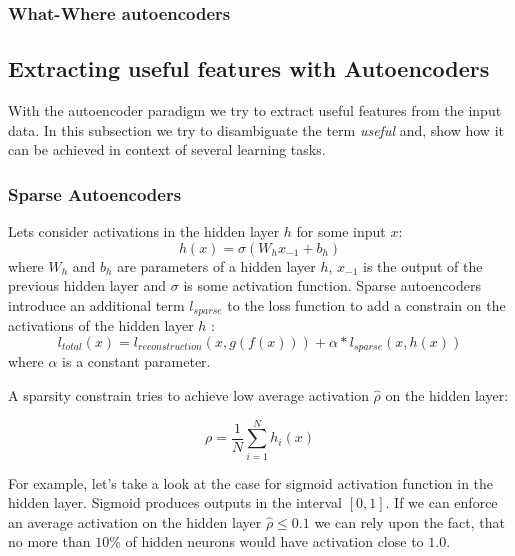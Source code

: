 \subsubsection{What-Where autoencoders}



\subsection{Extracting useful features with Autoencoders}\label{ch:mod_ae}

With the autoencoder paradigm we try to extract useful features from the input data. In this subsection we try to disambiguate the term \textit{useful} and, show how it can be achieved in context of several learning tasks.

\subsubsection{Sparse Autoencoders}\label{ch:sae}

Lets consider activations in the hidden layer $h$ for some input $x$:
\begin{equation}
  h(x) = \sigma(W_{h}x_{-1} + b_{h})
\end{equation}
where $W_h$ and $b_h$ are parameters of a hidden layer $h$, $x_{-1}$ is the output of the previous hidden layer and $\sigma$ is some activation function.
Sparse autoencoders introduce an additional term $l_{sparse}$ to the loss function to add a constrain on the activations of the hidden layer $h$ \cite{Ng2011}:
\begin{equation}
  l_{total}(x) = l_{reconstruction}(x, g(f(x))) + \alpha*l_{sparse}(x, h(x))
\end{equation}
where $\alpha$ is a constant parameter.

A sparsity constrain tries to achieve low average activation $\hat{\rho}$ on the hidden layer:

\begin{equation}\label{eq:avgh}
  \rho = \frac{1}{N} \sum_{i=1}^N h_i(x)
\end{equation}

For example, let's take a look at the case for sigmoid activation function in the hidden layer.
Sigmoid produces outputs in the interval $[0, 1]$. If we can enforce an average activation on the hidden layer $\hat{\rho} \leq 0.1$ we can rely upon the fact, that no more than $10\%$ of hidden neurons would have activation close to $1.0$.

